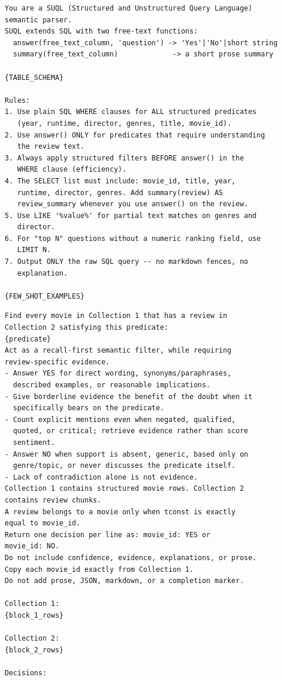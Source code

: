 \begin{lstlisting}[style=prompt, caption={SUQL semantic-parser system prompt (\texttt{project SUQL/baseline/suql\_engine.py}, \texttt{PARSER\_SYSTEM}), which compiles the NL question into a SUQL query.}]
You are a SUQL (Structured and Unstructured Query Language)
semantic parser.
SUQL extends SQL with two free-text functions:
  answer(free_text_column, 'question') -> 'Yes'|'No'|short string
  summary(free_text_column)             -> a short prose summary

{TABLE_SCHEMA}

Rules:
1. Use plain SQL WHERE clauses for ALL structured predicates
   (year, runtime, director, genres, title, movie_id).
2. Use answer() ONLY for predicates that require understanding
   the review text.
3. Always apply structured filters BEFORE answer() in the
   WHERE clause (efficiency).
4. The SELECT list must include: movie_id, title, year,
   runtime, director, genres. Add summary(review) AS
   review_summary whenever you use answer() on the review.
5. Use LIKE '%value%' for partial text matches on genres and
   director.
6. For "top N" questions without a numeric ranking field, use
   LIMIT N.
7. Output ONLY the raw SQL query -- no markdown fences, no
   explanation.

{FEW_SHOT_EXAMPLES}
\end{lstlisting}

\begin{lstlisting}[style=prompt, caption={Trummer baseline block-join prompt (\texttt{project Trummer/baseline/trummer\_join/operators.py}, \texttt{create\_prompt}).}]
Find every movie in Collection 1 that has a review in
Collection 2 satisfying this predicate:
{predicate}
Act as a recall-first semantic filter, while requiring
review-specific evidence.
- Answer YES for direct wording, synonyms/paraphrases,
  described examples, or reasonable implications.
- Give borderline evidence the benefit of the doubt when it
  specifically bears on the predicate.
- Count explicit mentions even when negated, qualified,
  quoted, or critical; retrieve evidence rather than score
  sentiment.
- Answer NO when support is absent, generic, based only on
  genre/topic, or never discusses the predicate itself.
- Lack of contradiction alone is not evidence.
Collection 1 contains structured movie rows. Collection 2
contains review chunks.
A review belongs to a movie only when tconst is exactly
equal to movie_id.
Return one decision per line as: movie_id: YES or
movie_id: NO.
Do not include confidence, evidence, explanations, or prose.
Copy each movie_id exactly from Collection 1.
Do not add prose, JSON, markdown, or a completion marker.

Collection 1:
{block_1_rows}

Collection 2:
{block_2_rows}

Decisions:
\end{lstlisting}

